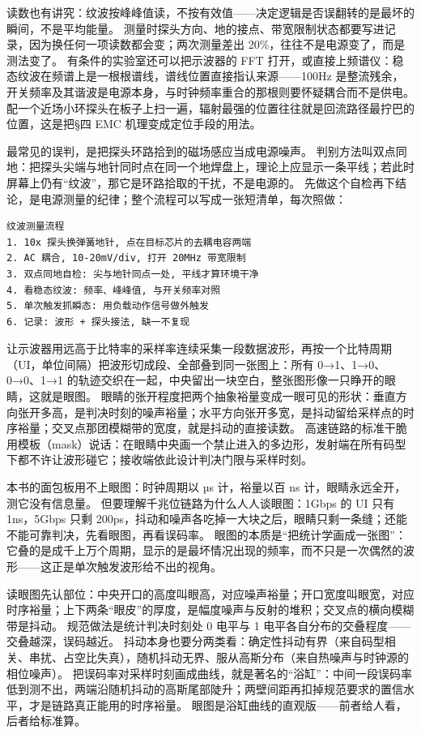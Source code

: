 读数也有讲究：纹波按峰峰值读，不按有效值——决定逻辑是否误翻转的是最坏的瞬间，不是平均能量。
测量时探头方向、地的接点、带宽限制状态都要写进记录，因为换任何一项读数都会变；两次测量差出 20\%，往往不是电源变了，而是测法变了。
有条件的实验室还可以把示波器的 FFT 打开，或直接上频谱仪：稳态纹波在频谱上是一根根谱线，谱线位置直接指认来源——100Hz 是整流残余，开关频率及其谐波是电源本身，与时钟频率重合的那根则要怀疑耦合而不是供电。
配一个近场小环探头在板子上扫一遍，辐射最强的位置往往就是回流路径最拧巴的位置，这是把§四 EMC 机理变成定位手段的用法。

最常见的误判，是把探头环路拾到的磁场感应当成电源噪声。
判别方法叫双点同地：把探头尖端与地针同时点在同一个地焊盘上，理论上应显示一条平线；若此时屏幕上仍有“纹波”，那它是环路拾取的干扰，不是电源的。
先做这个自检再下结论，是电源测量的纪律；整个流程可以写成一张短清单，每次照做：

\begin{lstlisting}
纹波测量流程
1. 10x 探头换弹簧地针, 点在目标芯片的去耦电容两端
2. AC 耦合, 10-20mV/div, 打开 20MHz 带宽限制
3. 双点同地自检: 尖与地针同点一处, 平线才算环境干净
4. 看稳态纹波: 频率、峰峰值, 与开关频率对照
5. 单次触发抓瞬态: 用负载动作信号做外触发
6. 记录: 波形 + 探头接法, 缺一不复现
\end{lstlisting}

让示波器用远高于比特率的采样率连续采集一段数据波形，再按一个比特周期（UI，单位间隔）把波形切成段、全部叠到同一张图上：所有 0→1、1→0、0→0、1→1 的轨迹交织在一起，中央留出一块空白，整张图形像一只睁开的眼睛，这就是眼图。
眼睛的张开程度把两个抽象裕量变成一眼可见的形状：垂直方向张开多高，是判决时刻的噪声裕量；水平方向张开多宽，是抖动留给采样点的时序裕量；交叉点那团模糊带的宽度，就是抖动的直接读数。
高速链路的标准干脆用模板（mask）说话：在眼睛中央画一个禁止进入的多边形，发射端在所有码型下都不许让波形碰它；接收端依此设计判决门限与采样时刻。

本书的面包板用不上眼图：时钟周期以 µs 计，裕量以百 ns 计，眼睛永远全开，测它没有信息量。
但要理解千兆位链路为什么人人谈眼图：1Gbps 的 UI 只有 1ns，5Gbps 只剩 200ps，抖动和噪声各吃掉一大块之后，眼睛只剩一条缝；还能不能可靠判决，先看眼图，再看误码率。
眼图的本质是“把统计学画成一张图”：它叠的是成千上万个周期，显示的是最坏情况出现的频率，而不只是一次偶然的波形——这正是单次触发波形给不出的视角。

读眼图先认部位：中央开口的高度叫眼高，对应噪声裕量；开口宽度叫眼宽，对应时序裕量；上下两条“眼皮”的厚度，是幅度噪声与反射的堆积；交叉点的横向模糊带是抖动。
规范做法是统计判决时刻处 0 电平与 1 电平各自分布的交叠程度——交叠越深，误码越近。
抖动本身也要分两类看：确定性抖动有界（来自码型相关、串扰、占空比失真），随机抖动无界、服从高斯分布（来自热噪声与时钟源的相位噪声）。
把误码率对采样时刻画成曲线，就是著名的“浴缸”：中间一段误码率低到测不出，两端沿随机抖动的高斯尾部陡升；两壁间距再扣掉规范要求的置信水平，才是链路真正能用的时序裕量。
眼图是浴缸曲线的直观版——前者给人看，后者给标准算。

